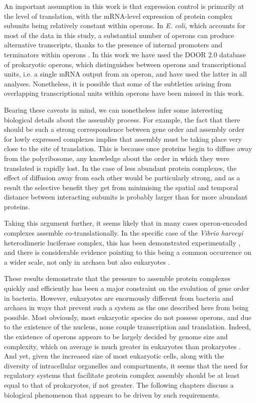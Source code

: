 \documentclass[a4paper,11pt,twoside,openright]{scrbook}
\begin{document}
An important assumption in this work is that expression control is primarily at the level of translation, with the mRNA-level expression of protein complex subunits being relatively constant within operons. In \textit{E. coli}, which accounts for most of the data in this study, a substantial number of operons can produce alternative transcripts, thanks to the presence of internal promoters and terminators within operons \cite{Conway2014}. In this work we have used the DOOR 2.0 database of prokaryotic operons, which distinguishes between operons and transcriptional units, i.e. a single mRNA output from an operon, and have used the latter in all analyses. Nonetheless, it is possible that some of the subtleties arising from overlapping transcriptional units within operons have been missed in this work.

Bearing these caveats in mind, we can nonetheless infer some interesting biological details about the assembly process. For example, the fact that there should be such a strong correspondence between gene order and assembly order for lowly expressed complexes implies that assembly must be taking place very close to the site of translation. This is because once proteins begin to diffuse away from the polyribosome, any knowledge about the order in which they were translated is rapidly lost. In the case of less abundant protein complexes, the effect of diffusion away from each other would be particularly strong, and as a result the selective benefit they get from minimising the spatial and temporal distance between interacting subunits is probably larger than for more abundant proteins.

Taking this argument further, it seems likely that in many cases operon-encoded complexes assemble co-translationally. In the specific case of the \textit{Vibrio harveyi} heterodimeric luciferase complex, this has been demonstrated experimentally \cite{Shieh2015a}, and there is considerable evidence pointing to this being a common occurrence on a wider scale, not only in archaea but also eukaryotes \cite{Duncan2011,Wells2015,Natan2017}.

These results demonstrate that the pressure to assemble protein complexes quickly and efficiently has been a major constraint on the evolution of gene order in bacteria. However, eukaryotes are enormously different from bacteria and archaea in ways that prevent such a system as the one described here from being possible. Most obviously, most eukaryotic species do not possess operons, and due to the existence of the nucleus, none couple transcription and translation. Indeed, the existence of operons appears to be largely decided by genome size and complexity, which on average is much greater in eukaryotes than prokaryotes \cite{Nunez2013}. And yet, given the increased size of most eukaryotic cells, along with the diversity of intracellular organelles and compartments, it seems that the need for regulatory systems that facilitate protein complex assembly should be at least equal to that of prokaryotes, if not greater. The following chapters discuss a biological phenomenon that appears to be driven by such requirements.

\end{document}
